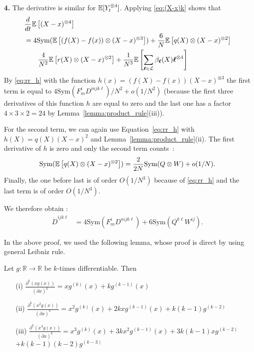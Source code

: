 \documentclass[sigconf]{acmart}
\newcommand\bl{{\text{\boldmath$\ell$}}}
\newcommand\R{\mathbb{R}}
\newcommand\calL{\mathcal{L}}
\newcommand\esp[1]{{\mathchoice{\besp{#1}}{\sesp{#1}}{\sesp{#1}}{\sesp{#1}}}}
\newcommand\besp[1]{\mathbb{E}\left[#1\right]}
\newcommand\sesp[1]{\mathbb{E}[#1]}
\newcommand\dt{\frac{d}{dt}}
\newcommand\Sym{\mathrm{Sym}}
\begin{document}
  \textbf{4.} The derivative is similar for
  $\esp{Y_t^{\otimes4}}$. Applying \eqref{eq:(X-x)k} shows that
  \begin{align*}
    &\dt \esp{(X-x)^{\otimes4}}\\
    &=4\Sym(\esp{(f(X)-f(x))\otimes (X-x)^{\otimes 3}})
      +\frac{6}N\esp{q(X)\otimes(X-x)^{\otimes2}}\\
    &\qquad\frac{4}{N^2}\esp{r(X)\otimes(X-x)^{\otimes2}}
      +\frac{1}{N^3}\esp{\sum_{\bl\in\calL}\beta_{\bl}(X)\bl^{\otimes4}}
  \end{align*}
  By \eqref{eq:rr_h} with the function
  $h(x)=(f(X)-f(x))(X-x)^{\otimes 3}$ the first term is equal to
  $4\Sym(F^i_mD^{mjk\ell})/N^2+o(1/N^2)$ (because the first three
  derivatives of this function $h$ are equal to zero and the last one
  has a factor $4\times3\times2=24$ by
  Lemma~\ref{lemma:product_rule}(iii)).

  For the second term, we can again use Equation~\eqref{eq:rr_h} with
  $h(X)=q(X)(X-x)^2$ and Lemma~\ref{lemma:product_rule}(ii). The first
  derivative of $h$ is zero and only the second term counts~:
  \begin{align*}
    \Sym(\esp{q(X)\otimes(X-x)^{\otimes2}}) = \frac2{2N}\Sym(Q\otimes
    W) + o(1/N). 
  \end{align*}
  Finally, the one before last is of order $O(1/N^3)$ because of
  \eqref{eq:rr_h} and the last term is of order $O(1/N^3)$.
  
  We therefore obtain :
  \begin{align*}
    \dot{D}^{ijk\ell}
    &= 4\Sym(F^{i}_{m}D^{mjk\ell}) + 6\Sym(Q^{k\ell}W^{ij}).
  \end{align*}

In the above proof, we used the following lemma, whose proof is direct
by using general Leibniz rule. 
\begin{lemma}
  \label{lemma:product_rule}
  Let $g:\R\to\R$ be $k$-times differentiable. Then
  \begin{itemize}
  \item[(i)] $\frac{\partial^k(xg(x))}{(\partial x)^k}= x g^{(k)}(x) + k
    g^{(k-1)}(x)$
  \item[(ii)]
    $\frac{\partial^k(x^2g(x))}{(\partial x)^k}= x^2 g^{(k)}(x) + 2kx
    g^{(k-1)}(x)+k(k-1)g^{(k-2)}$
  \item[(iii)]
    $ \frac{\partial^k(x^3g(x))}{(\partial x)^k}= x^3 g^{(k)}(x) + 3k
    x^2 g^{(k-1)}(x)+3k(k-1)xg^{(k-2)}$\\\phantom{+}\hspace{1.5cm}
    $+k(k-1)(k-2)g^{(k-3)}$
  \end{itemize}
  
\end{lemma}
\end{document}
